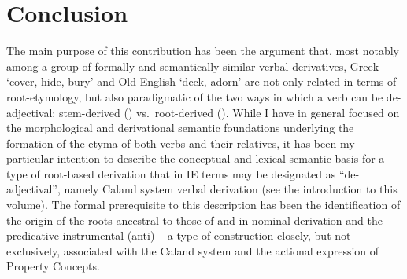 \documentclass[output=paper,colorlinks,citecolor=brown]{langscibook}
\begin{document}
\section{Conclusion}

The main purpose of this contribution has been the argument that, most notably among a group of formally and semantically similar verbal derivatives, Greek  ‘cover, hide, bury’ and Old English  ‘deck, adorn’ are not only related in terms of root-etymology, but also paradigmatic of the two ways in which a verb can be de-adjectival: stem-derived  () vs.\ root-derived \mbox{().} While I have in general focused on the morphological and derivational semantic foundations underlying the formation of the etyma of both verbs and their relatives, it has been my particular intention to describe the conceptual and lexical semantic basis for a type of root-based derivation that in IE terms may be designated as “de-adjectival”, namely Caland system verbal derivation  (see the introduction to this volume). The formal prerequisite to this description has been the identification of the origin of the roots ancestral to those of  and  in nominal derivation and the predicative instrumental (anti)   -- a type of construction closely, but not exclusively, associated with the Caland system  and the actional expression of Property Concepts. 
\end{document}

